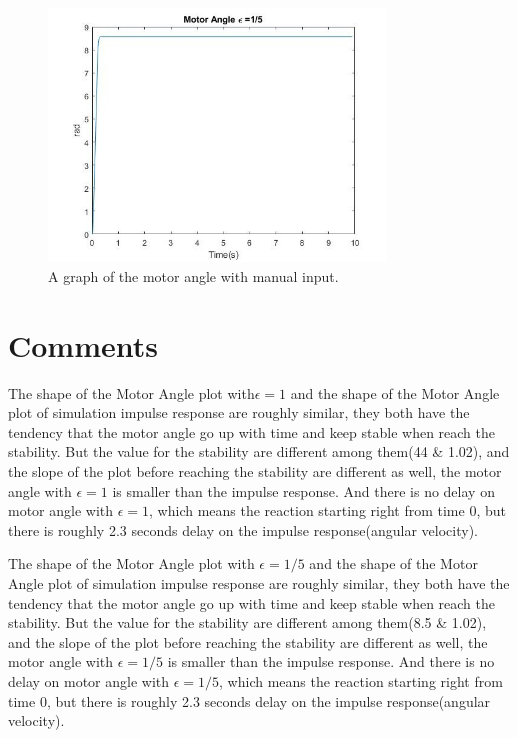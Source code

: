 \begin{figure}[H]
	\centering
	\includegraphics[width=0.8\textwidth]{./figures/lab6_motorangle_e_5.jpg}
	\caption{A graph of the motor angle with manual input.}
	\label{fig:}
\end{figure}

\section{Comments}

The shape of the Motor Angle plot with$\epsilon = 1$ and the shape of the Motor  Angle plot of simulation impulse response are roughly similar, they both have the tendency that the motor angle go up with time and keep stable when reach the stability. But the value for the stability are different among them(44 \& 1.02), and the slope of the plot before reaching the stability are different  as well, the motor angle with $\epsilon = 1$ is smaller than the impulse response.  And there is no delay on motor angle with $\epsilon = 1$, which means the reaction starting right from time 0, but there is roughly 2.3 seconds delay on the impulse response(angular velocity).

The shape of the Motor Angle plot with $\epsilon = 1/5$ and the shape of the Motor  Angle plot of simulation impulse response are roughly similar, they both have the tendency that the motor angle go up with time and keep stable when reach the stability. But the value for the stability are different among them(8.5 \& 1.02), and the slope of the plot before reaching the stability are different  as well, the motor angle with $\epsilon = 1/5$  is smaller than the impulse response.  And there is no delay on motor angle with $\epsilon = 1/5 $, which means the reaction starting right from time 0, but there is roughly 2.3 seconds delay on the impulse response(angular velocity).

